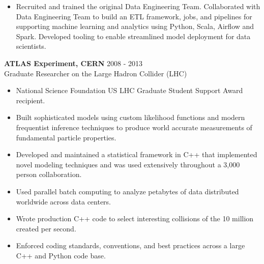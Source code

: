 \documentclass[9pt]{article}
\newenvironment{changemargin}[2]{%
  \begin{list}{}{%
    \setlength{\topsep}{0pt}%
    \setlength{\leftmargin}{#1}%
    \setlength{\rightmargin}{#2}%
    \setlength{\listparindent}{\parindent}%
    \setlength{\itemindent}{\parindent}%
    \setlength{\parsep}{\parskip}%
  }%
  \item[]}{\end{list}
}
\newenvironment{body} {
  \vspace*{-16pt}
\begin{changemargin}{-0.25in}{-0.5in}
  }
{\end{changemargin}
}
\begin{document}
\begin{body}
\begin{itemize}
    \item Recruited and trained the original Data Engineering Team.  Collaborated with Data Engineering Team to build an ETL framework, jobs, and pipelines for supporting machine learning and analytics using Python, Scala, Airflow and Spark.  Developed tooling to enable streamlined model deployment for data scientists. \\
  \end{itemize}

        \medskip

        \textbf{ATLAS Experiment, CERN} \hfill 2008 - 2013\\
        Graduate Researcher on the Large Hadron Collider (LHC) \\
        \medskip

        \begin{itemize}

        \item National Science Foundation US LHC Graduate Student Support Award recipient.

        \item Built sophisticated models using custom likelihood functions and modern frequentist inference techniques to produce world accurate measurements of fundamental particle properties.

        \item Developed and maintained a statistical framework in C++ that implemented novel modeling techniques and was used extensively throughout a 3,000 person collaboration.

        \item Used parallel batch computing to analyze petabytes of data distributed worldwide across data centers.

        \item Wrote production C++ code to select interesting collisions of the 10 million created per second.

        \item Enforced coding standards, conventions, and best practices across a large C++ and Python code base.

        \end{itemize}

\end{body}
\end{document}
